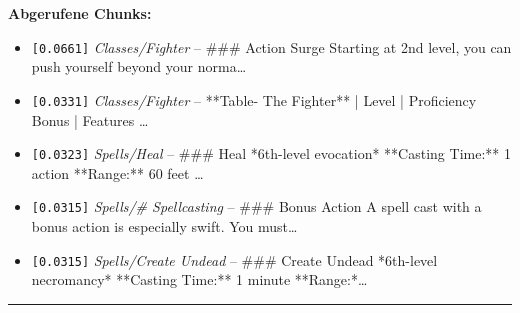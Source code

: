 \noindent\textbf{Abgerufene Chunks:}
\begin{itemize}[noitemsep, topsep=2pt]
  \item[\textbf{\#1}] \texttt{[0.0661]} \textit{Classes/Fighter} -- \#\#\# Action Surge  Starting at 2nd level, you can push yourself beyond your norma\ldots
  \item[\textbf{\#2}] \texttt{[0.0331]} \textit{Classes/Fighter} -- **Table- The Fighter**  | Level | Proficiency Bonus | Features                  \ldots
  \item[\textbf{\#3}] \texttt{[0.0323]} \textit{Spells/Heal} -- \#\#\# Heal  *6th-level evocation*  **Casting Time:** 1 action  **Range:** 60 feet \ldots
  \item[\textbf{\#4}] \texttt{[0.0315]} \textit{Spells/# Spellcasting} -- \#\#\# Bonus Action  A spell cast with a bonus action is especially swift. You must\ldots
  \item[\textbf{\#5}] \texttt{[0.0315]} \textit{Spells/Create Undead} -- \#\#\# Create Undead  *6th-level necromancy*  **Casting Time:** 1 minute  **Range:*\ldots
\end{itemize}
\vspace{4pt}
\hrule
\vspace{6pt}
